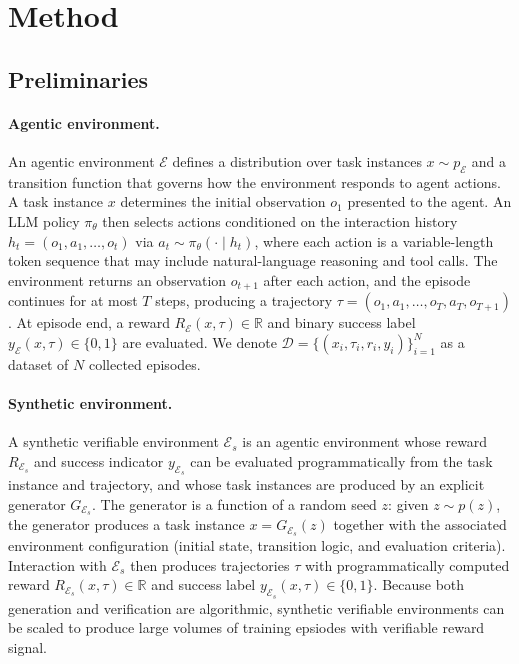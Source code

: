 \section{Method}

\subsection{Preliminaries}

\paragraph{Agentic environment.}
An agentic environment $\mathcal{E}$ defines a distribution over task instances $x \sim p_{\mathcal{E}}$ and a transition function that governs how the environment responds to agent actions. A task instance $x$ determines the initial observation $o_1$ presented to the agent. An LLM policy $\pi_\theta$ then selects actions conditioned on the interaction history $h_t = (o_1, a_1, \dots, o_t)$ via $a_t \sim \pi_\theta(\cdot \mid h_t)$, where each action is a variable-length token sequence that may include natural-language reasoning and tool calls. The environment returns an observation $o_{t+1}$ after each action, and the episode continues for at most $T$ steps, producing a trajectory $\tau = (o_1, a_1, \dots, o_T, a_T, o_{T+1})$. At episode end, a reward $R_{\mathcal{E}}(x, \tau) \in \mathbb{R}$ and binary success label $y_{\mathcal{E}}(x, \tau) \in \{0, 1\}$ are evaluated. We denote $\mathcal{D} = \{(x_i, \tau_i, r_i, y_i)\}_{i=1}^N$ as a dataset of $N$ collected episodes.

\paragraph{Synthetic environment.}
A synthetic verifiable environment $\mathcal{E}_s$ is an agentic environment whose reward $R_{\mathcal{E}_s}$ and success indicator $y_{\mathcal{E}_s}$ can be evaluated programmatically from the task instance and trajectory, and whose task instances are produced by an explicit generator $G_{\mathcal{E}_s}$. The generator is a function of a random seed $z$: given $z \sim p(z)$, the generator produces a task instance $x = G_{\mathcal{E}_s}(z)$ together with the associated environment configuration (initial state, transition logic, and evaluation criteria). Interaction with $\mathcal{E}_s$ then produces trajectories $\tau$ with programmatically computed reward $R_{\mathcal{E}_s}(x,\tau) \in \mathbb{R}$ and success label $y_{\mathcal{E}_s}(x,\tau) \in \{0,1\}$. Because both generation and verification are algorithmic, synthetic verifiable environments can be scaled to produce large volumes of training epsiodes with verifiable reward signal.



